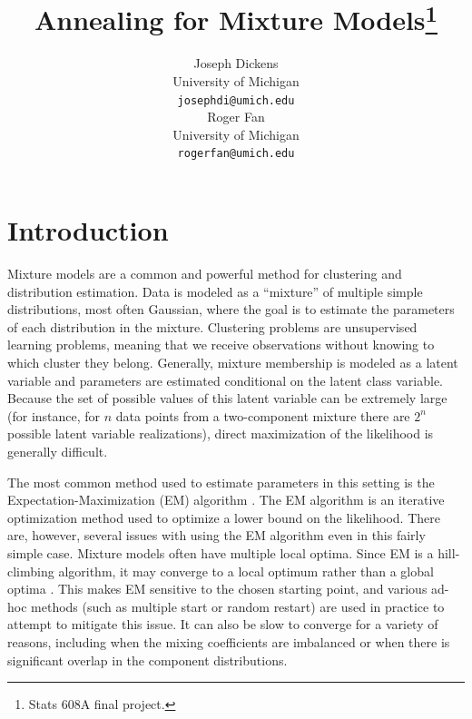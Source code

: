 \documentclass{article}
\theoremstyle{definition}
\theoremstyle{algodesc}
\begin{document}
\title{Annealing for Mixture Models\thanks{Stats 608A final project.}}
\author{
  Joseph Dickens \\
  University of Michigan \\
  \texttt{josephdi@umich.edu} \\
\And
  Roger Fan \\
  University of Michigan\\
  \texttt{rogerfan@umich.edu} \\
}

\maketitle


\section{Introduction} \label{sec:intro}


Mixture models are a common and powerful method for clustering and distribution estimation. Data is modeled as a ``mixture'' of multiple simple distributions, most often Gaussian, where the goal is to estimate the parameters of each distribution in the mixture. Clustering problems are unsupervised learning problems, meaning that we receive observations without knowing to which cluster they belong. Generally, mixture membership is modeled as a latent variable and parameters are estimated conditional on the latent class variable. Because the set of possible values of this latent variable can be extremely large (for instance, for $n$ data points from a two-component mixture there are $2^n$ possible latent variable realizations), direct maximization of the likelihood is generally difficult.

The most common method used to estimate parameters in this setting is the Expectation-Maximization (EM) algorithm \cite{dempsterlairdrubin77}. The EM algorithm is an iterative optimization method used to optimize a lower bound on the likelihood. There are, however, several issues with using the EM algorithm even in this fairly simple case. Mixture models often have multiple local optima. Since EM is a hill-climbing algorithm, it may converge to a local optimum rather than a global optima \cite{wu83}. This makes EM sensitive to the chosen starting point, and various ad-hoc methods (such as multiple start or random restart) are used in practice to attempt to mitigate this issue. It can also be slow to converge for a variety of reasons, including when the mixing coefficients are imbalanced or when there is significant overlap in the component distributions.
\end{document}
